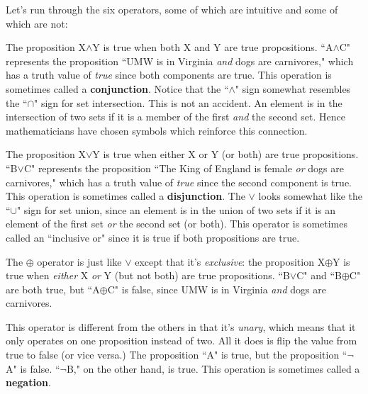 Let's run through the six operators, some of which are intuitive and some
of which are not:

\begin{description}

\item[$\wedge$ (``and")] The proposition X$\wedge$Y is true when both X and
Y are true propositions. ``A$\wedge$C" represents the proposition ``UMW is
in Virginia \textit{and} dogs are carnivores," which has a truth value of
\textsl{true} since both components are true. This operation is sometimes
called a \textbf{conjunction}. Notice that the ``$\wedge$"
sign somewhat resembles the ``$\cap$" sign for set intersection. This is
not an accident. An element is in the intersection of two sets if it is a
member of the first \textit{and} the second set. Hence mathematicians have
chosen symbols which reinforce this connection.

\item[$\vee$ (``or")] The proposition X$\vee$Y is true when either X or Y
(or both) are true propositions. ``B$\vee$C" represents the proposition
``The King of England is female \textit{or} dogs are carnivores," which has
a truth value of \textsl{true} since the second component is true. This
operation is sometimes called a \textbf{disjunction}. The
$\vee$ looks somewhat like the ``$\cup$" sign for set union, since an
element is in the union of two sets if it is an element of the first set
\textit{or} the second set (or both). This operator is sometimes called an
``inclusive or" since it is true if both propositions are true.

\item[$\oplus$ (``xor")] The $\oplus$ operator is just like $\vee$ except
that it's \textit{exclusive}: the proposition X$\oplus$Y is true when
\textit{either} X \textit{or} Y (but not both) are true propositions. 
``B$\vee$C" and ``B$\oplus$C" are both true, but ``A$\oplus$C" is false,
since UMW is in Virginia \textit{and} dogs are carnivores.

\item[$\neg$ (``not")] This operator is different from the others in that
it's \textit{unary}, which means that it only operates on one proposition
instead of two. All it does is flip the value from true to false (or vice
versa.) The proposition ``A" is true, but the proposition ``$\neg$A" is
false. ``$\neg$B," on the other hand, is true. This operation is sometimes
called a \textbf{negation}.


\end{description}
